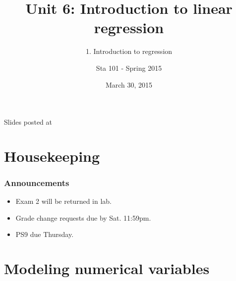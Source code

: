 \documentclass[slidestop,compress,mathserif,12pt,t,professionalfonts,xcolor=table]{beamer}
\title{Unit 6: Introduction to linear regression}
\subtitle{1. Introduction to regression}
\author{Sta 101 - Spring 2015}
\date{March 30, 2015}
\institute{Duke University, Department of Statistical Science}
\begin{document}


\begin{frame}[plain]

\titlepage
\vfill
{\scriptsize {} \hfill Slides posted at  \webLink{\CourseSite}{\CourseSite}}
\addtocounter{framenumber}{-1} 

\end{frame}


\section{Housekeeping}


\begin{frame}
\frametitle{Announcements}

\begin{itemize}






\item Exam 2 will be returned in lab.

\item Grade change requests due by Sat. 11:59pm.

\item PS9 due Thursday.

\end{itemize}

\end{frame}


\section{Modeling numerical variables}
\end{document}
